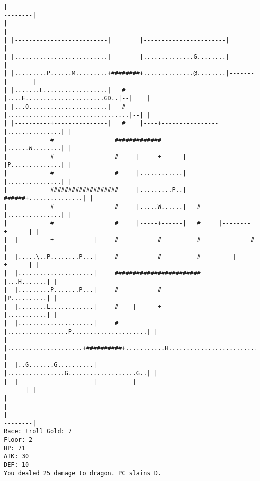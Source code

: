 \documentclass[11pt]{article}
\theoremstyle{plain}
\begin{document}
\begin{Verbatim}[fontsize=\scriptsize]
|-----------------------------------------------------------------------------|
|                                                                             |
| |--------------------------|        |-----------------------|               |
| |..........................|        |..............G........|               |
| |.........P......M.........+########+..............@........|-------|       |
| |.......L..................|   #    |....E......................GD..|--|    |
| |...O......................|   #    |..................................|--| |
| |----------+---------------|   #    |----+----------------|...............| |
|            #                 #############                |......W........| |
|            #                 #     |-----+------|         |P..............| |
|            #                 #     |............|         |...............| |
|            ###################     |.........P..|   ######+...............| |
|            #                 #     |.....W......|   #     |...............| |
|            #                 #     |-----+------|   #     |--------+------| |
|  |---------+-----------|     #           #          #              #        |
|  |.....\..P........P...|     #           #          #         |----+------| |
|  |.....................|     ########################         |...H.......| |
|  |.........P.......P...|     #           #                    |P..........| |
|  |........L............|     #    |------+--------------------|...........| |
|  |.....................|     #    |.................P.....................| |
|  |.....................+##########+...........H...........................| |
|  |..G.......G..........|          |................G...................G..| |
|  |---------------------|          |---------------------------------------| |
|                                                                             |
|-----------------------------------------------------------------------------|
Race: troll Gold: 7                                                    Floor: 2
HP: 71
ATK: 30
DEF: 10
You dealed 25 damage to dragon. PC slains D.
\end{Verbatim}
\end{document}
